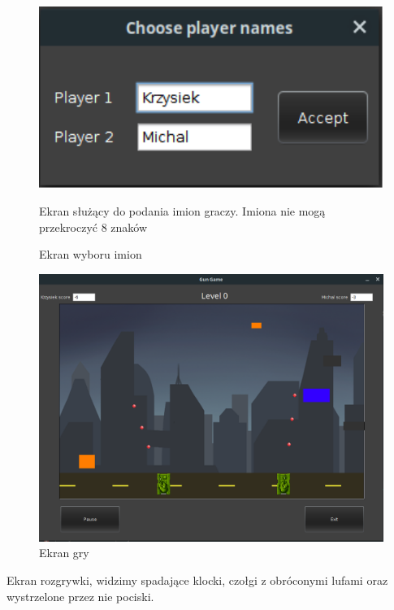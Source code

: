 \documentclass[12pt]{report}
\begin{document}
\begin{itemize}
\begin{figure}[H]
    \includegraphics[width=14cm]{obrazy/playerName.png}
    \caption{Ekran wyboru imion}
    \label{name choice screen}
    \item Ekran służący do podania imion graczy. Imiona nie mogą przekroczyć 8 znaków
    \end{figure}
    \begin{figure}[H]
    \centering
    \includegraphics[width=14cm]{obrazy/screenGame.png}
    \caption{Ekran gry}
    \label{game screen}
    \end{figure}
    \item Ekran rozgrywki, widzimy spadające klocki, czołgi z obróconymi lufami oraz wystrzelone przez nie pociski.
    \begin{figure}[H]
    \centering

\end{figure}
\end{itemize}
\end{document}
